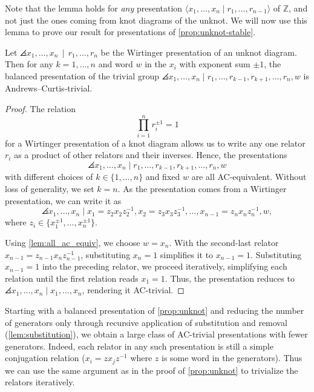 Note that the lemma holds for \emph{any} presentation $\langle x_1,\ldots, x_n \mid r_1,\ldots,r_{n-1}\rangle$ of $\mathbb{Z}$, and not just the ones coming from knot diagrams of the unknot. We will now use this lemma to prove our result for presentations of \cref{prop:unknot-stable}.

\begin{theorem} \label{prop:unknot}
    Let $\angles{ x_1,\ldots, x_n\, \mid \, r_1, \ldots, r_n }$ be the Wirtinger presentation of an unknot diagram. Then for any $k=1,\ldots,n$ and word $w$ in the $x_i$ with exponent sum $\pm 1$, the balanced presentation of the trivial group $\angles{ x_1,\ldots, x_n \mid r_1,\ldots, r_{k-1}, r_{k+1},\ldots, r_n, w}$ is Andrews--Curtis-trivial.
\end{theorem}

\begin{proof}
The relation  $$\prod\limits_{i=1}^nr_i^{\pm1}=1$$ for a Wirtinger presentation of a knot diagram allows us to write any one relator $r_i$ as a product of other relators and their inverses. Hence, the presentations 
$$\angles{x_1, \ldots, x_n \mid r_1, \ldots, r_{k-1}, r_{k+1}, \ldots, r_n, w}$$ with different choices of $k \in \{1, \ldots, n\}$ and fixed $w$ are all AC-equivalent. Without loss of generality, we set $k=n$. As the presentation comes from a Wirtinger presentation, we can write it as 
\[
\angles{ x_1,\ldots,x_n \mid x_1=z_2x_2z_2^{-1}, x_2=z_3x_3z_3^{-1},\ldots, x_{n-1}=z_{n}x_nz_{n}^{-1}, w },
\]
where $z_i\in \{x_1^{\pm 1},\ldots, x_n^{\pm 1}\}$. 

Using \cref{lem:all_ac_equiv}, we choose $w = x_n$. 
With the second-last relator \( x_{n-1} = z_{n-1} x_n z_{n-1}^{-1} \), substituting \( x_n = 1 \) simplifies it to \( x_{n-1} = 1 \). Substituting \( x_{n-1} = 1 \) into the preceding relator, we proceed iteratively, simplifying each relation until the first relation reads \( x_1 = 1 \). 
Thus, the presentation reduces to  $\angles{x_1, \ldots, x_n \mid x_1, \ldots, x_n}$,
rendering it AC-trivial. 
\end{proof}
\begin{remark}
    Starting with a balanced presentation of \cref{prop:unknot} and reducing the number of generators only through recursive application of substitution and removal (\cref{lem:substitution}), we obtain a large class of AC-trivial presentations with fewer generators. Indeed, each relator in any such presentation is still a simple conjugation relation ($x_i=zx_jz^{-1}$ where $z$ is some word in the generators). Thus we can use the same argument as in the proof of \cref{prop:unknot} to trivialize the relators iteratively. 
\end{remark}

